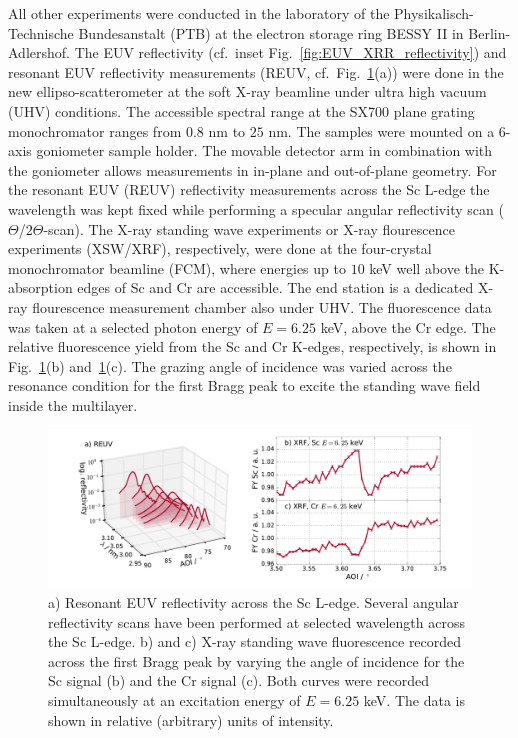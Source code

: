 \documentclass{iucr}              %
\begin{document}
All other experiments were conducted in the laboratory of the Physikalisch-Technische Bundesanstalt (PTB) at the electron storage ring BESSY II in Berlin-Adlershof. The EUV reflectivity (cf.~inset Fig.~\ref{fig:EUV_XRR_reflectivity}) and resonant EUV reflectivity measurements (REUV, cf.~Fig.~\ref{fig:REUV_XRF_data}(a)) were done in the new ellipso-scatterometer at the soft X-ray beamline \cite{Beckhoff2009} under ultra high vacuum (UHV) conditions. The accessible spectral range at the SX700 plane grating monochromator ranges from $0.8$ nm to $25$ nm. The samples were mounted on a 6-axis goniometer sample holder. The movable detector arm in combination with the goniometer allows measurements in in-plane and out-of-plane geometry. For the resonant EUV (REUV) reflectivity measurements across the Sc L-edge the wavelength was kept fixed while performing a specular angular reflectivity scan ($\Theta$/$2\Theta$-scan). The X-ray standing wave experiments or X-ray flourescence experiments (XSW/XRF), respectively, were done at the four-crystal monochromator beamline (FCM), where energies up to $10$ keV well above the K-absorption edges of Sc and Cr are accessible. The end station is a dedicated X-ray flourescence measurement chamber also under UHV. The fluorescence data was taken at a selected photon energy of $E=6.25$ keV, above the Cr edge. The relative fluorescence yield from the Sc and Cr K-edges, respectively, is shown in Fig.~\ref{fig:REUV_XRF_data}(b) and~\ref{fig:REUV_XRF_data}(c). The grazing angle of incidence was varied across the resonance condition for the first Bragg peak to excite the standing wave field inside the multilayer.
\onecolumn
\begin{figure}
  \centering
  \includegraphics[width=\textwidth]{images/reuv_xrf_data}
  \caption{a) Resonant EUV reflectivity across the Sc L-edge. Several angular reflectivity scans have been performed at selected wavelength across the Sc L-edge. b) and c) X-ray standing wave fluorescence recorded across the first Bragg peak by varying the angle of incidence for the Sc signal (b) and the Cr signal (c). Both curves were recorded simultaneously at an excitation energy of $E=6.25$ keV. The data is shown in relative (arbitrary) units of intensity.}
  \label{fig:REUV_XRF_data}
\end{figure}
\twocolumn
\end{document}
